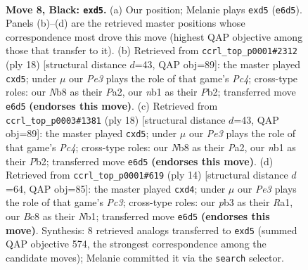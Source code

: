 \documentclass[11pt]{article}
\begin{document}
\begin{figure}[p]\centering
\begin{subfigure}{0.46\textwidth}\centering
\resizebox{\linewidth}{!}{%
\newchessgame
\chessboard[
  setfen={rnbq1rk1/pp4pp/2pbpn2/3P1p2/3P4/1P3NP1/P3PPBP/RNBQ1RK1 b - - 0 8},
  showmover=false,
  pgfstyle=straightmove, color=movearrow, markmove={e6-d5}
]}
\caption{}
\end{subfigure}\hfill
\begin{subfigure}{0.46\textwidth}\centering
\resizebox{\linewidth}{!}{%
\newchessgame
\chessboard[
  setfen={r1bq1rk1/pp3pbp/n2p1np1/2pp4/2P5/2NBPN1P/PP3PP1/R1BQ1RK1 w - - 0 10},
  showmover=false,
  pgfstyle=straightmove, color=movearrow, markmove={c4-d5}
]}
\caption{}
\end{subfigure}
\\[4pt]
\begin{subfigure}{0.46\textwidth}\centering
\resizebox{\linewidth}{!}{%
\newchessgame
\chessboard[
  setfen={r1bq1rk1/pp3pbp/n2p1np1/2pp4/2P5/2NBPN1P/PP3PP1/R1BQ1RK1 w - - 0 10},
  showmover=false,
  pgfstyle=straightmove, color=movearrow, markmove={c4-d5}
]}
\caption{}
\end{subfigure}\hfill
\begin{subfigure}{0.46\textwidth}\centering
\resizebox{\linewidth}{!}{%
\newchessgame
\chessboard[
  setfen={rnbqk2r/pp1pppbp/1n4p1/4P3/3p4/1BP2N2/PP3PPP/RNBQK2R w KQkq - 4 8},
  showmover=false,
  pgfstyle=straightmove, color=movearrow, markmove={c3-d4}
]}
\caption{}
\end{subfigure}
\caption{\textbf{Move 8, Black: \texttt{exd5}.} (a) Our position; Melanie plays \texttt{exd5} (\texttt{e6d5}). Panels (b)--(d) are the retrieved master positions whose correspondence most drove this move (highest QAP objective among those that transfer to it). (b) Retrieved from \texttt{ccrl\_top\_p0001\#2312} (ply 18) [structural distance $d$=43, QAP obj=89]: the master played \texttt{cxd5}; under $\mu$ our \emph{Pe3} plays the role of that game's \emph{Pc4}; cross-type roles: our \emph{N}b8 as their \emph{P}a2, our \emph{n}b1 as their \emph{P}b2; transferred move \texttt{e6d5} \textbf{(endorses this move)}. (c) Retrieved from \texttt{ccrl\_top\_p0003\#1381} (ply 18) [structural distance $d$=43, QAP obj=89]: the master played \texttt{cxd5}; under $\mu$ our \emph{Pe3} plays the role of that game's \emph{Pc4}; cross-type roles: our \emph{N}b8 as their \emph{P}a2, our \emph{n}b1 as their \emph{P}b2; transferred move \texttt{e6d5} \textbf{(endorses this move)}. (d) Retrieved from \texttt{ccrl\_top\_p0001\#619} (ply 14) [structural distance $d$=64, QAP obj=85]: the master played \texttt{cxd4}; under $\mu$ our \emph{Pe3} plays the role of that game's \emph{Pc3}; cross-type roles: our \emph{p}b3 as their \emph{R}a1, our \emph{B}c8 as their \emph{N}b1; transferred move \texttt{e6d5} \textbf{(endorses this move)}. Synthesis: 8 retrieved analogs transferred to \texttt{exd5} (summed QAP objective 574, the strongest correspondence among the candidate moves); Melanie committed it via the \texttt{search} selector.}
\label{fig:thought-m15}
\end{figure}
\end{document}
